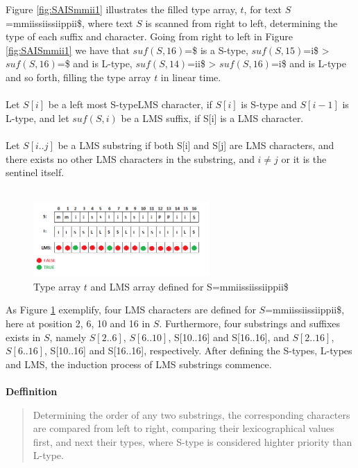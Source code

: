 \documentclass[12pt]{article} %
\begin{document}
Figure \ref{fig:SAISmmii1} illustrates the filled type array, $t$, for text $S$=mmiissiissiippii\$, where text $S$ is scanned from right to left, determining the type of each suffix and character. Going from right to left in Figure \ref{fig:SAISmmii1} we have that $suf(S,16)$=\$ is a S-type, $suf(S,15)$=i\$ > $suf(S,16)$=\$ and is L-type, $suf(S,14)$=ii\$ > $suf(S,16)$=i\$ and is L-type and so forth, filling the type array $t$ in linear time.
\\ \\
Let $S[i]$ be a left most S-typeLMS character, if $S[i]$ is S-type and $S[i-1]$ is L-type, and let $suf(S,i)$ be a LMS suffix, if S[i] is a LMS character.
\\ \\
Let $S[i..j]$ be a LMS substring if both S[i] and S[j] are LMS characters, and there exists no other LMS characters in the substring, and $i \neq j$ or it is the sentinel itself.
\\ \\

\begin{figure}[H]
    \centering
    \includegraphics[width=0.6\textwidth]{SAISmmii2}
    \captionsetup{width=0.8\textwidth}
    \caption{Type array $t$ and LMS array defined for S=mmiissiissiippii\$}
    \label{fig:SAISmmii2}
\end{figure}

As Figure \ref{fig:SAISmmii2} exemplify, four LMS characters are defined for $S$=mmiissiissiippii\$, here at position 2, 6, 10 and 16 in $S$. Furthermore, four substrings and suffixes exists in $S$, namely $S[2..6]$, $S[6..10]$, S[10..16] and S[16..16], and $S[2..16]$, $S[6..16]$, S[10..16] and S[16..16], respectively.
After defining the S-types, L-types and LMS, the induction process of LMS substrings commence.
\\ \\

\textbf{Deffinition}
\begin{quote}
Determining the order of any two substrings, the corresponding characters are compared from left to right, comparing their lexicographical values first, and next their types, where S-type is considered highter priority than L-type.
\end{quote}
\end{document}
